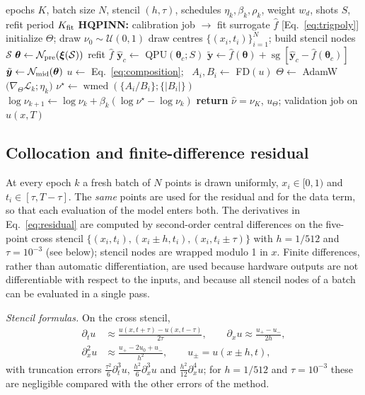 \documentclass[floatfix,aps,pra,twocolumn,showpacs,superscriptaddress,10pt,nofootinbib]{revtex4-2}
\newcommand{\wmed}{\operatorname{wmed}}
\newcommand{\sg}{\operatorname{sg}}
\begin{document}
\begin{appendices}
\begin{algorithm}[H]
\caption{Inverse (H)QPINN training}\label{alg:train}
\small
\begin{algorithmic}[1]
\Require epochs $K$, batch size $N$, stencil $(h,\tau)$, schedules $\eta_k,\beta_k,\rho_k$, weight $w_d$, shots $S$, refit period $K_{\rm fit}$
\State \textbf{HQPINN:} calibration job $\to$ fit surrogate $\hat f$ [Eq.~\eqref{eq:trigpoly}]
\State initialize $\Theta$; draw $\nu_0\sim\mathcal U(0,1)$
  \State draw centres $\{(x_i,t_i)\}_{i=1}^N$; build stencil nodes $\mathcal S$
  \State $\bm\theta\gets\mathcal N_{\rm pre}(\bm\xi(\mathcal S))$
      refit $\hat f$ \EndIf
     \State $\hat{\bm y}_c\gets$ QPU$(\bm\theta_c;S)$ 
     \State $\tilde{\bm y}\gets\hat f(\bm\theta)+\sg[\hat{\bm y}_c-\hat f(\bm\theta_c)]$ 
  \Else \State $\tilde{\bm y}\gets\mathcal N_{\rm mid}(\bm\theta)$
  \EndIf
  \State $u\gets$ Eq.~\eqref{eq:composition}; \ $A_i,B_i\gets$ FD$(u)$
  \State $\Theta\gets$ AdamW$\big(\nabla_\Theta\mathcal L_k;\eta_k\big)$ 
  \State $\nu^\star\gets\wmed(\{A_i/B_i\};\{|B_i|\})$ 
  \State $\log\nu_{k+1}\gets\log\nu_k+\beta_k(\log\nu^\star-\log\nu_k)$
\EndFor
\State \textbf{return} $\hat\nu=\nu_K$, $u_\Theta$; validation job on $u(x,T)$
\end{algorithmic}
\end{algorithm}

\subsection{Collocation and finite-difference residual}\label{sec:fd}
At every epoch $k$ a fresh batch of $N$ points is drawn uniformly, $x_i\in[0,1)$ and $t_i\in[\tau,T-\tau]$. The \emph{same} points are used for the residual and for the data term, so that each evaluation of the model enters both. The derivatives in Eq.~\eqref{eq:residual} are computed by second-order central differences on the five-point cross stencil $\{(x_i,t_i),(x_i\pm h,t_i),(x_i,t_i\pm\tau)\}$ with $h=1/512$ and $\tau=10^{-3}$ (see below); stencil nodes are wrapped modulo 1 in $x$. Finite differences, rather than automatic differentiation, are used because hardware outputs are not differentiable with respect to the inputs, and because all stencil nodes of a batch can be evaluated in a single pass.

\emph{Stencil formulas.} On the cross stencil,
\begin{align}
  \partial_tu&\approx\frac{u(x,t+\tau)-u(x,t-\tau)}{2\tau},\qquad \partial_xu\approx\frac{u_{+}-u_{-}}{2h},\nonumber\\
  \partial_x^2u&\approx\frac{u_{+}-2u_0+u_{-}}{h^2},\qquad u_\pm=u(x\pm h,t),
\end{align}
with truncation errors $\tfrac{\tau^2}{6}\partial_t^3u$, $\tfrac{h^2}{6}\partial_x^3u$ and $\tfrac{h^2}{12}\partial_x^4u$; for $h=1/512$ and $\tau=10^{-3}$ these are negligible compared with the other errors of the method.


\end{appendices}
\end{document}
